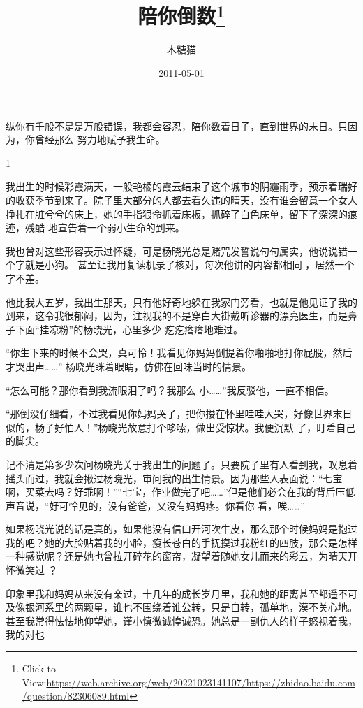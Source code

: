 \documentclass{article}
\title{陪你倒数\footnote{Click to View:\url{https://web.archive.org/web/20221023141107/https://zhidao.baidu.com/question/82306089.html}}}
\author{木糖猫}
\date{2011-05-01}
\begin{document}

\maketitle


\Large

纵你有千般不是是万般错误，我都会容忍，陪你数着日子，直到世界的末日。只因为，你曾经那么
努力地赋予我生命。 


1 

我出生的时候彩霞满天，一般艳橘的霞云结束了这个城市的阴霾雨季，预示着瑞好的收获季节到来了。院子里大部分的人都去看久违的晴天，没有谁会留意一个女人挣扎在脏兮兮的床上，她的手指狠命抓着床板，抓碎了白色床单，留下了深深的痕迹，残酷
地宣告着一个弱小生命的到来。 

我也曾对这些形容表示过怀疑，可是杨晓光总是赌咒发誓说句句属实，他说说错一个字就是小狗。
\newpage
甚至让我用复读机录了核对，每次他讲的内容都相同
，居然一个字不差。 

他比我大五岁，我出生那天，只有他好奇地躲在我家门旁看，也就是他见证了我的到来，这令我很郁闷，因为，注视我的不是穿白大褂戴听诊器的漂亮医生，而是鼻子下面“挂凉粉”的杨晓光，心里多少
疙疙瘩瘩地难过。 

“你生下来的时候不会哭，真可怜！我看见你妈妈倒提着你啪啪地打你屁股，然后才哭出声……”
杨晓光眯着眼睛，仿佛在回味当时的情景。 

“怎么可能？那你看到我流眼泪了吗？我那么
小……”我反驳他，一直不相信。 

“那倒没仔细看，不过我看见你妈妈哭了，把你搂在怀里哇哇大哭，好像世界末日似的，杨子好怕人！”杨晓光故意打个哆嗦，做出受惊状。我便沉默
了，盯着自己的脚尖。 

\newpage

记不清是第多少次问杨晓光关于我出生的问题了。只要院子里有人看到我，叹息着摇头而过，我就会揪过杨晓光，审问我的出生情景。因为那些人表面说：“七宝啊，买菜去吗？好乖啊！”“七宝，作业做完了吧……”但是他们必会在我的背后压低声音说，“好可怜见的，没有爸爸，又没有妈妈疼。你看你
看，唉……” 

如果杨晓光说的话是真的，如果他没有信口开河吹牛皮，那么那个时候妈妈是抱过我的吧？她的大脸贴着我的小脸，瘦长苍白的手抚摸过我粉红的四肢，那会是怎样一种感觉呢？还是她也曾拉开碎花的窗帘，凝望着随她女儿而来的彩云，为晴天开怀微笑过
？ 

印象里我和妈妈从来没有亲过，十几年的成长岁月里，我和她的距离甚至都遥不可及像银河系里的两颗星，谁也不围绕着谁公转，只是自转，孤单地，漠不关心地。甚至我常得怯怯地仰望她，谨小慎微诚惶诚恐。她总是一副仇人的样子怒视着我，我的对也
\end{document}
